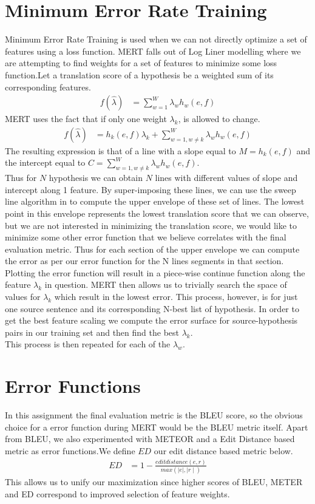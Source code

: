 \documentclass[11pt]{article}
\newcommand{\lam}{\lambda}
\begin{document}
\section{Minimum Error Rate Training}
Minimum Error Rate Training is used when we can not directly optimize a set of
features using a loss function\cite{och2003minimum}. MERT falls out of Log
Liner modelling where we are attempting to find weights for a set of features to minimize some loss
function.Let a translation score of a hypothesis be a weighted sum of its
corresponding features.
\begin{align*}
f(\hat{\lam}) &= \sum_{w=1}^W \lam_w h_w(e,f)
\end{align*}
MERT uses the fact that if only one weight $\lam_k$, is allowed to
change.
\begin{align*}
f(\hat{\lam}) &= h_k(e,f)\lam_k + \sum_{w=1,w \neq k}^W \lam_wh_w(e,f)
\end{align*} 
The resulting expression is that of a line with a slope equal to
$M = h_k(e,f)$ and the intercept equal to $C = \sum_{w=1,w \neq k}^W \lam_w
h_w(e,f)$.\\
Thus for $N$ hypothesis we can obtain $N$ lines with different values
of slope and intercept along 1 feature. By super-imposing these lines, we can
use the sweep line algorithm in \cite{macherey2008lattice} to compute the upper
envelope of these set of lines. The lowest point in this envelope represents the
lowest translation score that we can observe, but we are not interested in
minimizing the translation score, we would like to minimize some other error
function that we believe correlates with the final evaluation metric. Thus for
each section of the upper envelope we can compute the error as per our error
function for the N lines segments in that section. Plotting the error function
will result in a piece-wise continue function along the feature $\lam_k$ in
question. MERT then allows us to trivially search the space of values for
$\lam_k$ which result in the lowest error. This process, however, is for just
one source sentence and its corresponding N-best list of hypothesis. In order to
get the best feature scaling we compute the error surface for source-hypothesis
pairs in our training set and then find the best $\lam_k$.\\ This process is
then repeated for each of the $\lam_w$.
 \section{Error Functions}
In this assignment the final evaluation metric is the BLEU score, so the obvious
choice for a error function during MERT would be the BLEU metric itself. Apart
from BLEU, we also experimented with METEOR and a Edit Distance based metric as
error functions.We define $ED$ our edit distance based metric below.
\begin{align*}
ED &= 1 - \frac{editdistance(e,r)}{max(\mid e \mid , \mid r \mid)}
\end{align*}
This allows us to unify our maximization since higher scores of BLEU, METER and
ED correspond to improved selection of feature weights.\\
\end{document}
